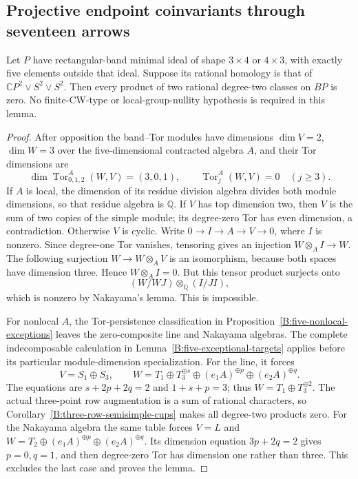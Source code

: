 \subsection{Projective endpoint coinvariants through seventeen arrows}

\begin{lemma}
\label{C:three-by-four-five-outside-rank-three}
Let $P$ have rectangular-band minimal ideal of shape $3\times4$
or $4\times3$, with exactly five elements outside that ideal.
Suppose its rational homology is that of
$\mathbb CP^2\vee S^2\vee S^2$.  Then every product of two
rational degree-two classes on $BP$ is zero.  No finite-CW-type
or local-group-nullity hypothesis is required in this lemma.
\end{lemma}
\begin{proof}
After opposition the band--Tor modules have dimensions
$\dim V=2$, $\dim W=3$ over the five-dimensional contracted
algebra $A$, and their Tor dimensions are
\[
 \dim\operatorname{Tor}_{0,1,2}^A(W,V)=(3,0,1),\qquad
 \operatorname{Tor}_j^A(W,V)=0\quad(j\geq3).
\]
If $A$ is local, the dimension of its residue division algebra
divides both module dimensions, so that residue algebra is
$\mathbb Q$.  If $V$ has top dimension two, then $V$ is the
sum of two copies of the simple module; its degree-zero Tor
has even dimension, a contradiction.  Otherwise $V$ is cyclic.
Write $0\to I\to A\to V\to0$, where $I$ is nonzero.
Since degree-one Tor vanishes, tensoring gives an injection
$W\otimes_A I\to W$.  The following surjection
$W\to W\otimes_A V$ is an isomorphism, because both spaces
have dimension three.  Hence $W\otimes_A I=0$.
But this tensor product surjects onto
\[
 (W/WJ)\otimes_{\mathbb Q}(I/JI),
\]
which is nonzero by Nakayama's lemma.  This is impossible.

For nonlocal $A$, the Tor-persistence classification in
Proposition~\ref{B:five-nonlocal-exceptions} leaves the
zero-composite line and Nakayama algebras.  The complete
indecomposable calculation in Lemma~\ref{B:five-exceptional-targets}
applies before its particular module-dimension specialization.
For the line, it forces
\[
 V=S_1\oplus S_3,\qquad
 W=T_1\oplus T_3^{\oplus s}\oplus(e_1A)^{\oplus p}
                         \oplus(e_2A)^{\oplus q}.
\]
The equations are $s+2p+2q=2$ and $1+s+p=3$;
thus $W=T_1\oplus T_3^{\oplus2}$.
The actual three-point row augmentation is a sum of rational
characters, so Corollary~\ref{B:three-row-semisimple-cups}
makes all degree-two products zero.
For the Nakayama algebra the same table forces $V=L$ and
$W=T_2\oplus(e_1A)^{\oplus p}\oplus(e_2A)^{\oplus q}$.
Its dimension equation $3p+2q=2$ gives $p=0,q=1$,
and then degree-zero Tor has dimension one rather than three.
This excludes the last case and proves the lemma.
\end{proof}

